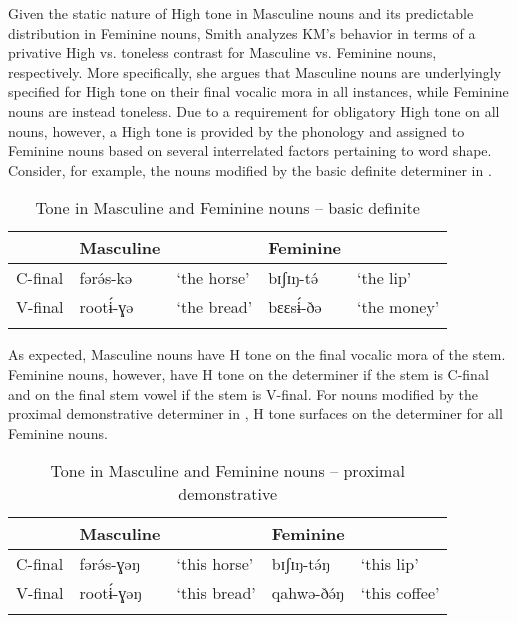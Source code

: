 \documentclass[output=paper,colorlinks,citecolor=brown]{langscibook}
\begin{document}
Given the static nature of High tone in Masculine nouns and its predictable distribution in Feminine nouns, Smith \citeyearpar{Smith2022} analyzes KM's behavior in terms of a  privative High vs. toneless contrast for Masculine vs. Feminine nouns, respectively. More specifically, she argues that Masculine nouns are underlyingly specified for High tone on their final vocalic mora in all instances, while Feminine nouns are instead toneless. Due to a requirement for  obligatory High tone on all nouns, however, a High tone is provided by the phonology and assigned to Feminine nouns based on several interrelated factors pertaining to word shape. Consider, for example, the nouns modified by the basic definite determiner in . 

\begin{table}
\caption{Tone in Masculine and Feminine nouns -- basic definite}
\label{tab:MFBasicDef}
 \begin{tabular}{lllll}
  \lsptoprule
  &      Masculine  &  & Feminine &  \\
  \midrule
 C-final& fərə́s-kə & `the horse' & bɪʃɪŋ-tə́  & `the lip' \\
 V-final & rootɨ́-ɣə & `the bread' & bɛɛsɨ́-ðə & `the money' \\
  \lspbottomrule
 \end{tabular}
\end{table}

As expected, Masculine nouns have H tone on the final vocalic mora of the stem. Feminine nouns, however, have H tone on the determiner if the stem is C-final and on the final stem vowel if the stem is V-final. For nouns modified by the proximal demonstrative determiner in , H tone surfaces on the determiner for all Feminine nouns.

\begin{table}
\caption{Tone in Masculine and Feminine nouns -- proximal demonstrative}
\label{tab:MFProxDem}
 \begin{tabular}{lllll}
  \lsptoprule
  &      Masculine  &  & Feminine &  \\
  \midrule
C-final & fərə́s-ɣəŋ & `this horse' & bɪʃɪŋ-tə́ŋ & `this lip' \\
V-final & rootɨ́-ɣəŋ & `this bread' & qahwə-ðə́ŋ & `this coffee' \\
  \lspbottomrule
 \end{tabular}
\end{table}
\end{document}
